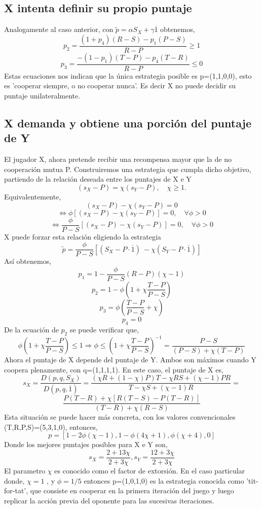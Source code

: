 \documentclass[11pt]{article}
\begin{document}
\subsection{X intenta definir su propio puntaje}
Analogamente al caso anterior, con $\tilde{p}=\alpha S_X + \gamma\overline1$  obtenemos,
$$p_2=\frac{(1+p_4)(R-S)-p_1(P-S)}{R-P}\geq 1$$
$$p_3=\frac{-(1-p_1)(T-P)-p_4(T-R)}{R-P}\leq 0$$
Estas ecuaciones nos indican que la única estrategia posible es p=(1,1,0,0), esto es 'cooperar siempre, o no cooperar nunca'. Es decir
X no puede decidir su puntaje unilateralmente.


\subsection{X demanda y obtiene una porción del puntaje de Y}
El jugador X, ahora pretende recibir una recompensa mayor que la de no cooperación mutua P.
Construiremos una estrategia que cumpla dicho objetivo, partiendo de la relación deseada entre los puntajes de X e Y
$$(s_X -P)=\chi (s_Y-P),\quad \chi \geq 1.$$
Equivalentemente,
$$(s_X -P)-\chi (s_Y-P)=0$$ $$\Leftrightarrow \phi[(s_X -P)-\chi (s_Y-P)]=0, \quad \forall \phi>0$$ $$\Leftrightarrow \frac{\phi}{P-S}[(s_X -P)-\chi (s_Y-P)]=0, \quad \forall \phi>0$$
X puede forzar esta relación eligiendo la estrategia
$$\tilde{p}=\frac{\phi}{P-S}[(S_X-P\cdot\overline1)\ - \chi (S_Y-P\cdot\overline1)]$$
Así obtenemos,
$$p_1=1-\frac{\phi}{P-S}(R-P)(\chi-1)$$
$$p_2=1-\phi(1+\chi \frac{T-P}{P-S})$$
$$p_3=\phi(\frac{T-P}{P-S}+\chi )$$
$$p_4=0$$
De la ecuación de $p_2$ se puede verificar que,
$$\phi(1+\chi\frac{T-P}{P-S})\leq 1 \Rightarrow \phi\leq(1+\chi \frac{T-P}{P-S})^{-1}=\frac{P-S}{(P-S) + \chi(T-P)}$$
Ahora el puntaje de X depende del puntaje de Y. Ambos son máximos cuando Y coopera plenamente, con
q=(1,1,1,1). En este caso, el puntaje de X es,
$$s_X= \frac{D(p,q,S_X)}{D(p,q,\overline1)}=\frac{(\chi R + (1-\chi)P)T-\chi RS+(\chi-1)PR}{T-\chi S+(\chi-1)R}=$$
$$\frac{P(T-R)+\chi[R(T-S)-P(T-R)]}{(T-R)+\chi(R-S)}$$
Esta situación se puede hacer más concreta, con los valores convencionales (T,R,P,S)=(5,3,1,0), entonces,
$$p=[1-2\phi(\chi-1),1-\phi(4 \chi+1),\phi(\chi+4),0]$$
Donde los mejores puntajes posibles para X e Y son,
$$s_X=\frac{2+13\chi}{2+3\chi}, s_Y=\frac{12+3\chi}{2+3\chi}$$
El parametro $\chi$ es conocido como el factor de extorsión. En el caso particular donde, $\chi=1$ , y $\phi =1/5$
entonces p=(1,0,1,0) es la estrategia conocida como 'tit-for-tat', que consiste en cooperar en la primera 
iteración del juego y luego replicar la acción previa del oponente para las sucesivas iteraciones.
\end{document}
